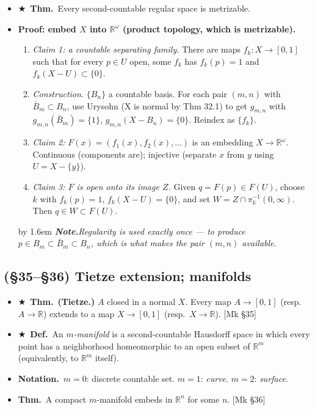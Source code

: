 \documentclass[12pt,a4paper]{article}
\newcommand{\Dfn}{\textbf{Def.}~}
\newcommand{\Thm}{\textbf{Thm.}~}
\newcommand{\Ntn}{\textbf{Notation.}~}
\newcommand{\Key}{$\bigstar$~}                  %
\newcommand{\Mk}[1]{{\footnotesize\textcolor{cue}{[Mk #1]}}}  %
\newcommand{\Cue}[1]{%
  \par\addvspace{7pt}\nopagebreak
  \begingroup
    \advance\leftskip by 1.6em
    \parindent=0pt \small\color{cue}%
    \textbf{\textit{Note.}}\enspace \textit{#1}\par
  \endgroup
  \addvspace{9pt}}
\newenvironment{BL}%
  {\begin{itemize}[leftmargin=1.4em,labelsep=0.55em,itemsep=11pt,topsep=11pt,parsep=0pt]}%
  {\end{itemize}}
\newenvironment{NL}%
  {\begin{enumerate}[label=(\arabic*),leftmargin=2em,labelsep=0.45em,itemsep=6pt,topsep=7pt,parsep=0pt]}%
  {\end{enumerate}}
\newcommand{\RR}{\mathbb{R}}
\begin{document}
\begin{BL}
\item \Key\Thm Every second-countable regular space is metrizable.
\item \textbf{Proof: embed $X$ into $\RR^\omega$ (product topology, which is metrizable).}
  \begin{NL}
  \item \emph{Claim 1: a countable separating family.} There are maps $f_k\colon X\to[0,1]$
        such that for every $p\in U$ open, some $f_k$ has $f_k(p)=1$ and $f_k(X-U)\subset\{0\}$.
  \item \emph{Construction.} $\{B_n\}$ a countable basis. For each pair $(m,n)$ with
        $\bar B_m\subset B_n$, use Urysohn (X is normal by Thm 32.1) to get $g_{m,n}$
        with $g_{m,n}(\bar B_m)=\{1\}$, $g_{m,n}(X-B_n)=\{0\}$. Reindex as $\{f_k\}$.
  \item \emph{Claim 2:} $F(x)=(f_1(x),f_2(x),\dots)$ is an embedding $X\to\RR^\omega$.
        Continuous (components are); injective (separate $x$ from $y$ using $U=X-\{y\}$).
  \item \emph{Claim 3: $F$ is open onto its image $Z$.} Given $q=F(p)\in F(U)$, choose $k$ with
        $f_k(p)=1$, $f_k(X-U)=\{0\}$, and set $W=Z\cap\pi_k^{-1}(0,\infty)$.
        Then $q\in W\subset F(U)$.
  \end{NL}
\Cue{Regularity is used exactly once --- to produce $p\in B_m\subset\bar B_m\subset B_n$,
which is what makes the pair $(m,n)$ available.}
\end{BL}

\subsection{(\S35--\S36) Tietze extension; manifolds}

\begin{BL}
\item \Key\Thm \textbf{(Tietze.)} $A$ closed in a normal $X$. Every map $A\to[0,1]$
      (resp.\ $A\to\RR$) extends to a map $X\to[0,1]$ (resp.\ $X\to\RR$). \Mk{\S35}
\item \Key\Dfn An \emph{$m$-manifold} is a second-countable Hausdorff space in which every point
      has a neighborhood homeomorphic to an open subset of $\RR^m$
      (equivalently, to $\RR^m$ itself).
\item \Ntn $m=0$: discrete countable set. $m=1$: \emph{curve}. $m=2$: \emph{surface}.
\item \Thm A compact $m$-manifold embeds in $\RR^n$ for some $n$. \Mk{\S36}
\end{BL}
\end{document}
